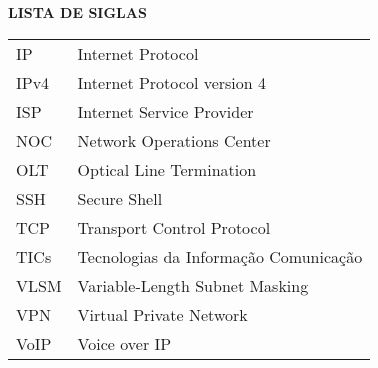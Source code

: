\begin{center}
  \normalsize{\textbf{LISTA DE SIGLAS}}
\end{center}

\vspace{1mm}

\begin{center}
  \begin{tabular}{ m{3cm} m{10cm} }
    IP & Internet Protocol \\ 
    IPv4 & Internet Protocol version 4 \\ 
    ISP & Internet Service Provider \\ 
    NOC & Network Operations Center \\ 
    OLT & Optical Line Termination \\ 
    SSH & Secure Shell \\ 
    TCP & Transport Control Protocol \\ 
    TICs & Tecnologias da Informação Comunicação \\ 
    VLSM & Variable-Length Subnet Masking \\ 
    VPN & Virtual Private Network \\ 
    VoIP & Voice over IP \\ 
  \end{tabular}
\end{center}
